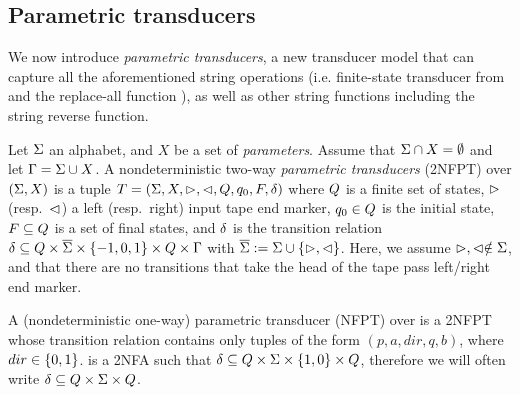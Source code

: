 

\subsection{Parametric transducers}

We now introduce \emph{parametric transducers}, a new transducer model that can 
capture all the
aforementioned string operations (i.e. finite-state transducer from
\cite{LB16} and the replace-all function \cite{CCHLW18}), as well as other 
string functions including the string reverse function.

\begin{definition}
    Let $\Sigma$ an alphabet, and $X$ be a set of \emph{parameters}. 
    Assume that $\Sigma \cap X = \emptyset$ and let $\Gamma = 
    \Sigma \cup X$.
    A nondeterministic two-way \emph{parametric transducers} (2NFPT) over 
    $(\Sigma,X)$ is a tuple $T =
(\Sigma, X, \vartriangleright, \vartriangleleft, Q, q_0, F, \delta)$ where 
    $Q$ is a finite set of 
    states, $\vartriangleright$ (resp.~$\vartriangleleft$) a left (resp.~right) input tape end 
    marker, $q_0\in Q$ is
the initial state, $F\subseteq Q$ is a set of final states, and 
    $\delta$ is the
transition relation  $\delta\subseteq Q \times 
    \overline{\Sigma}\times \{-1, 0, 1\}\times 
    Q \times \Gamma$ with
    $\overline{\Sigma} := \Sigma \cup \{\vartriangleright,\vartriangleleft\}$.
    Here, we assume $\vartriangleright, \vartriangleleft \notin \Sigma$, and that
    there are no transitions that take the head of the tape pass left/right
    end marker. 

    A (nondeterministic one-way) parametric transducer (NFPT) over
    is a 2NFPT whose transition relation contains only tuples of the form
    $(p,a,dir,q,b)$, where $dir \in \{0,1\}$.
is a 2NFA such that $\delta\subseteq Q \times \Sigma\times
    \{1,0\} \times Q $, therefore we
will often write $\delta\subseteq Q \times \Sigma \times 
    Q$. 
\end{definition}

